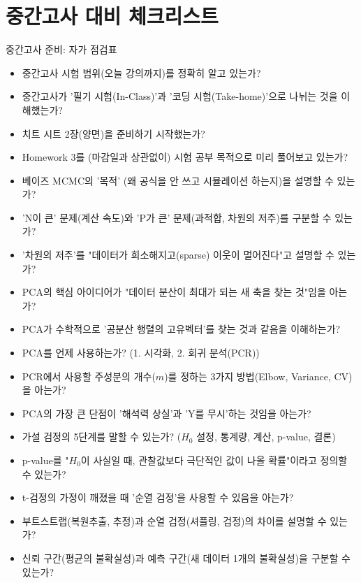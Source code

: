 \documentclass[11pt,a4paper]{book}
\theoremstyle{definition}
\begin{document}
\section{중간고사 대비 체크리스트}

\begin{tcolorbox}{중간고사 준비: 자가 점검표}
\begin{itemize}
    \item [ ] 중간고사 시험 범위(오늘 강의까지)를 정확히 알고 있는가?
    \item [ ] 중간고사가 '필기 시험(In-Class)'과 '코딩 시험(Take-home)'으로 나뉘는 것을 이해했는가?
    \item [ ] 치트 시트 2장(양면)을 준비하기 시작했는가?
    \item [ ] Homework 3를 (마감일과 상관없이) 시험 공부 목적으로 미리 풀어보고 있는가?
    \item [ ] 베이즈 MCMC의 '목적' (왜 공식을 안 쓰고 시뮬레이션 하는지)을 설명할 수 있는가?
    \item [ ] 'N이 큰' 문제(계산 속도)와 'P가 큰' 문제(과적합, 차원의 저주)를 구분할 수 있는가?
    \item [ ] '차원의 저주'를 "데이터가 희소해지고(sparse) 이웃이 멀어진다"고 설명할 수 있는가?
    \item [ ] PCA의 핵심 아이디어가 "데이터 분산이 최대가 되는 새 축을 찾는 것"임을 아는가?
    \item [ ] PCA가 수학적으로 '공분산 행렬의 고유벡터'를 찾는 것과 같음을 이해하는가?
    \item [ ] PCA를 언제 사용하는가? (1. 시각화, 2. 회귀 분석(PCR))
    \item [ ] PCR에서 사용할 주성분의 개수($m$)를 정하는 3가지 방법(Elbow, Variance, CV)을 아는가?
    \item [ ] PCA의 가장 큰 단점이 '해석력 상실'과 'Y를 무시'하는 것임을 아는가?
    \item [ ] 가설 검정의 5단계를 말할 수 있는가? ($H_0$ 설정, 통계량, 계산, p-value, 결론)
    \item [ ] p-value를 "$H_0$이 사실일 때, 관찰값보다 극단적인 값이 나올 확률"이라고 정의할 수 있는가?
    \item [ ] t-검정의 가정이 깨졌을 때 '순열 검정'을 사용할 수 있음을 아는가?
    \item [ ] 부트스트랩(복원추출, 추정)과 순열 검정(셔플링, 검정)의 차이를 설명할 수 있는가?
    \item [ ] 신뢰 구간(평균의 불확실성)과 예측 구간(새 데이터 1개의 불확실성)을 구분할 수 있는가?
\end{itemize}
\end{tcolorbox}
\end{document}
